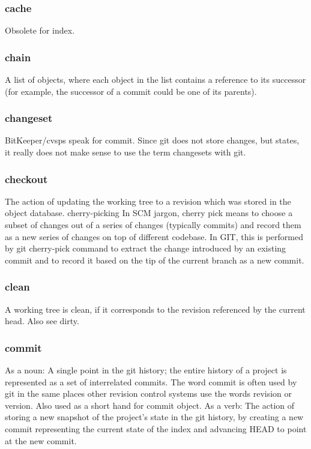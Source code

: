 \subsubsection{cache}

Obsolete for index.

\subsubsection{chain}

A list of objects, where each object in the list contains a reference to its successor (for example, the successor of a commit could be one of its parents).

\subsubsection{changeset}

BitKeeper/cvsps speak for commit. Since git does not store changes, but states, it really does not make sense to use the term changesets with git.

\subsubsection{checkout}

The action of updating the working tree to a revision which was stored in the object database.
cherry-picking
In SCM jargon, cherry pick means to choose a subset of changes out of a series of changes (typically commits) and record them as a new series of changes on top of different codebase. In GIT, this is performed by git cherry-pick command to extract the change introduced by an existing commit and to record it based on the tip of the current branch as a new commit.

\subsubsection{clean}

A working tree is clean, if it corresponds to the revision referenced by the current head. Also see dirty.

\subsubsection{commit}

As a noun: A single point in the git history; the entire history of a project is represented as a set of interrelated commits. The word commit is often used by git in the same places other revision control systems use the words revision or version. Also used as a short hand for commit object.
As a verb: The action of storing a new snapshot of the project's state in the git history, by creating a new commit representing the current state of the index and advancing HEAD to point at the new commit.

